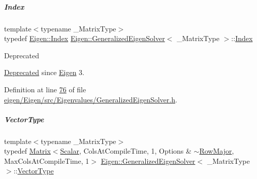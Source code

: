 \mbox{\label{group___eigenvalues___module_a46a0ff3841059479ec314e56a5645302}} 
\subparagraph{\texorpdfstring{Index}{Index}\hspace{0.1cm}{\footnotesize\ttfamily [2/2]}}
{\footnotesize\ttfamily template$<$typename \+\_\+\+Matrix\+Type$>$ \\
typedef \hyperlink{namespace_eigen_a62e77e0933482dafde8fe197d9a2cfde}{Eigen\+::\+Index} \hyperlink{group___eigenvalues___module_class_eigen_1_1_generalized_eigen_solver}{Eigen\+::\+Generalized\+Eigen\+Solver}$<$ \+\_\+\+Matrix\+Type $>$\+::\hyperlink{group___eigenvalues___module_a46a0ff3841059479ec314e56a5645302}{Index}}

\begin{DoxyRefDesc}{Deprecated}
\item[\hyperlink{deprecated__deprecated000019}{Deprecated}]since \hyperlink{namespace_eigen}{Eigen} 3. \end{DoxyRefDesc}


Definition at line \hyperlink{eigen_2_eigen_2src_2_eigenvalues_2_generalized_eigen_solver_8h_source_l00076}{76} of file \hyperlink{eigen_2_eigen_2src_2_eigenvalues_2_generalized_eigen_solver_8h_source}{eigen/\+Eigen/src/\+Eigenvalues/\+Generalized\+Eigen\+Solver.\+h}.

\mbox{\label{group___eigenvalues___module_a5aa3d1390c2b0d455c1c9b8b3101b119}} 
\subparagraph{\texorpdfstring{Vector\+Type}{VectorType}\hspace{0.1cm}{\footnotesize\ttfamily [1/2]}}
{\footnotesize\ttfamily template$<$typename \+\_\+\+Matrix\+Type$>$ \\
typedef \hyperlink{group___core___module_class_eigen_1_1_matrix}{Matrix}$<$\hyperlink{group___eigenvalues___module_afb318d0b097ff8dd5a7410d31317ca47}{Scalar}, Cols\+At\+Compile\+Time, 1, Options \& $\sim$\hyperlink{group__enums_ggaacded1a18ae58b0f554751f6cdf9eb13acfcde9cd8677c5f7caf6bd603666aae3}{Row\+Major}, Max\+Cols\+At\+Compile\+Time, 1$>$ \hyperlink{group___eigenvalues___module_class_eigen_1_1_generalized_eigen_solver}{Eigen\+::\+Generalized\+Eigen\+Solver}$<$ \+\_\+\+Matrix\+Type $>$\+::\hyperlink{group___eigenvalues___module_a5aa3d1390c2b0d455c1c9b8b3101b119}{Vector\+Type}}



